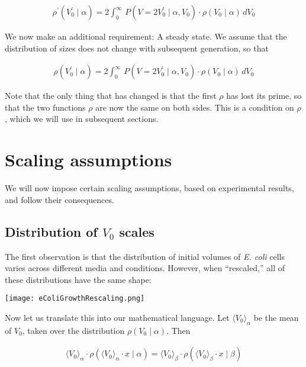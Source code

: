 \documentclass{article}
\begin{document}
\begin{align}
\rho^\prime (V_0^\prime \mid \alpha) = 2\int_0^\infty \, P(V = 2 V_0^\prime \mid \alpha, V_0) \cdot \rho(V_0 \mid \alpha) \, d V_0
\end{align}

We now make an additional requirement: A steady state. We assume that the distribution of sizes does not change with subsequent generation, so that

\begin{align} \label{eqSteadyState}
\rho (V_0^\prime\mid \alpha) = 2\int_0^\infty \, P(V = 2 V_0^\prime \mid \alpha, V_0) \cdot \rho(V_0 \mid \alpha) \, d V_0
\end{align}

Note that the only thing that has changed is that the first $\rho$ has lost its prime, so that the two functions $\rho$ are now the same on both sides. This is a condition on $\rho$, which we will use in subsequent sections.

\section{Scaling assumptions}

We will now impose certain scaling assumptions, based on experimental results, and follow their consequences.\\

\subsection{Distribution of $V_0$ scales}

The first observation\cite{Kennard2016} is that the distribution of initial volumes of \emph{E. coli} cells varies across different media and conditions. However, when ``rescaled,'' all of these distributions have the same shape:

\begin{center}
\texttt{[image: eColiGrowthRescaling.png]}
\end{center}

Now let us translate this into our mathematical language. Let $\langle V_0 \rangle_\alpha$ be the mean of $V_0$, taken over the distribution $\rho(V_0 \mid \alpha)$. Then

\begin{align}
\langle V_0 \rangle_\alpha \cdot \rho\left( \langle V_0 \rangle_\alpha \cdot x \mid  \alpha\right) = \langle V_0 \rangle_\beta \cdot \rho \left( \langle V_0 \rangle_\beta \cdot x \mid  \beta \right)
\end{align}
\end{document}
